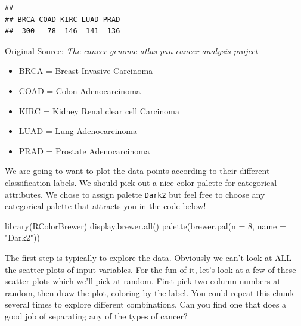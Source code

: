 \documentclass[
]{article}
\newenvironment{Shaded}{\begin{snugshade}}{\end{snugshade}}
\newcommand{\AttributeTok}[1]{\textcolor[rgb]{0.77,0.63,0.00}{#1}}
\newcommand{\ControlFlowTok}[1]{\textcolor[rgb]{0.13,0.29,0.53}{\textbf{#1}}}
\newcommand{\DecValTok}[1]{\textcolor[rgb]{0.00,0.00,0.81}{#1}}
\newcommand{\FunctionTok}[1]{\textcolor[rgb]{0.00,0.00,0.00}{#1}}
\newcommand{\NormalTok}[1]{#1}
\newcommand{\OtherTok}[1]{\textcolor[rgb]{0.56,0.35,0.01}{#1}}
\newcommand{\SpecialCharTok}[1]{\textcolor[rgb]{0.00,0.00,0.00}{#1}}
\newcommand{\StringTok}[1]{\textcolor[rgb]{0.31,0.60,0.02}{#1}}
\providecommand{\tightlist}{%
  \setlength{\itemsep}{0pt}\setlength{\parskip}{0pt}}
\theoremstyle{definition}
\theoremstyle{definition}
\theoremstyle{definition}
\theoremstyle{definition}
\theoremstyle{remark}
\begin{document}
\begin{verbatim}
## 
## BRCA COAD KIRC LUAD PRAD 
##  300   78  146  141  136
\end{verbatim}

Original Source: \emph{The cancer genome atlas pan-cancer analysis project}

\begin{itemize}
\tightlist
\item
  BRCA = Breast Invasive Carcinoma
\item
  COAD = Colon Adenocarcinoma
\item
  KIRC = Kidney Renal clear cell Carcinoma
\item
  LUAD = Lung Adenocarcinoma
\item
  PRAD = Prostate Adenocarcinoma
\end{itemize}

We are going to want to plot the data points according to their different classification labels. We should pick out a nice color palette for categorical attributes. We chose to assign palette \texttt{Dark2} but feel free to choose any categorical palette that attracts you in the code below!

\begin{Shaded}
\begin{Highlighting}[]
\FunctionTok{library}\NormalTok{(RColorBrewer)}
\FunctionTok{display.brewer.all}\NormalTok{()}
\FunctionTok{palette}\NormalTok{(}\FunctionTok{brewer.pal}\NormalTok{(}\AttributeTok{n =} \DecValTok{8}\NormalTok{, }\AttributeTok{name =} \StringTok{"Dark2"}\NormalTok{))}
\end{Highlighting}
\end{Shaded}

The first step is typically to explore the data. Obviously we can't look at ALL the scatter plots of input variables. For the fun of it, let's look at a few of these scatter plots which we'll pick at random. First pick two column numbers at random, then draw the plot, coloring by the label. You could repeat this chunk several times to explore different combinations. Can you find one that does a good job of separating any of the types of cancer?

\begin{Shaded}
\end{Shaded}
\end{document}
